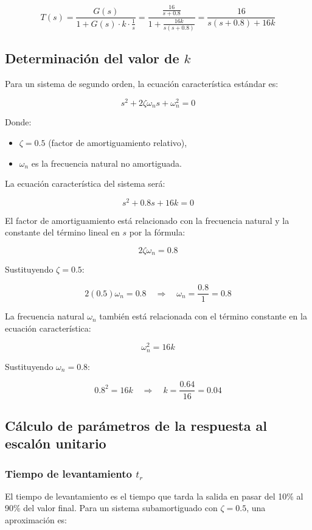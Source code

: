 \documentclass[10pt]{article}
\theoremstyle{definition}
\theoremstyle{remark}
\theoremstyle{definition}
\numberwithin{equation}{prob}
\begin{document}
\[
T(s) = \frac{G(s)}{1 + G(s) \cdot k \cdot \frac{1}{s}} = \frac{\frac{16}{s + 0.8}}{1 + \frac{16k}{s(s + 0.8)}} = \frac{16}{s(s + 0.8) + 16k}
\]

\subsection{Determinación del valor de \texorpdfstring{\(k\)}{k}}

Para un sistema de segundo orden, la ecuación característica estándar es:

\[
s^2 + 2\zeta \omega_n s + \omega_n^2 = 0
\]

Donde:
\begin{itemize}
    \item \(\zeta = 0.5\) (factor de amortiguamiento relativo),
    \item \(\omega_n\) es la frecuencia natural no amortiguada.
\end{itemize}

La ecuación característica del sistema será:

\[
s^2 + 0.8s + 16k = 0
\]

El factor de amortiguamiento está relacionado con la frecuencia natural y la constante del término lineal en \(s\) por la fórmula:

\[
2\zeta \omega_n = 0.8
\]

Sustituyendo \(\zeta = 0.5\):

\[
2(0.5) \omega_n = 0.8 \quad \Rightarrow \quad \omega_n = \frac{0.8}{1} = 0.8
\]

La frecuencia natural \(\omega_n\) también está relacionada con el término constante en la ecuación característica:

\[
\omega_n^2 = 16k
\]

Sustituyendo \(\omega_n = 0.8\):

\[
0.8^2 = 16k \quad \Rightarrow \quad k = \frac{0.64}{16} = 0.04
\]

\subsection{Cálculo de parámetros de la respuesta al escalón unitario}

\subsubsection{Tiempo de levantamiento \texorpdfstring{\(t_r\)}{tr}}

El tiempo de levantamiento es el tiempo que tarda la salida en pasar del 10\% al 90\% del valor final. Para un sistema subamortiguado con \(\zeta = 0.5\), una aproximación es:
\end{document}
